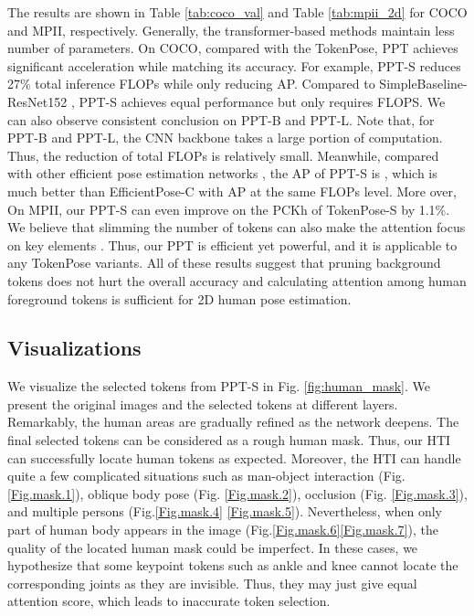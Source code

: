 \documentclass[runningheads]{llncs}
\begin{document}
The results are shown in Table \ref{tab:coco_val} and Table \ref{tab:mpii_2d} for COCO and MPII, respectively. 
Generally, the transformer-based methods \cite{li2021tokenpose,yang2020transpose} maintain less number of parameters. 
On COCO, compared with the TokenPose, PPT achieves significant acceleration while matching its accuracy. 
For example, PPT-S reduces 27\% total inference FLOPs while only reducing  AP. Compared to SimpleBaseline-ResNet152 \cite{xiao2018simple}, PPT-S achieves equal performance but only requires  FLOPS. 
We can also observe consistent conclusion on PPT-B and PPT-L. 
Note that, for PPT-B and PPT-L, the CNN backbone takes a large portion of computation. Thus, the reduction of total FLOPs is relatively small. 
Meanwhile, compared with other efficient pose estimation networks \cite{yu2021lite,zhang2021efficientpose}, the AP of PPT-S is , which is much better than EfficientPose-C \cite{zhang2021efficientpose}  with  AP at the same FLOPs level. 
More over, On MPII, our PPT-S can even improve on the PCKh of TokenPose-S by 1.1\%. 
We believe that slimming the number of tokens can also make the attention focus on key elements \cite{zhu2020deformable}. 
Thus, our PPT is efficient yet powerful, and it is applicable to any TokenPose variants. 
All of these results suggest that pruning background tokens does not hurt the overall accuracy and calculating attention among human foreground tokens is sufficient for 2D human pose estimation. 








\vspace{-0.5em}
\subsection{Visualizations}
\vspace{-0.5em}

We visualize the selected tokens from PPT-S in Fig. \ref{fig:human_mask}. We present the original images and the selected tokens at different layers.  
Remarkably, the human areas are gradually refined as the network deepens. The final selected tokens can be considered as a rough human mask. Thus, our HTI can successfully locate human tokens as expected. 
Moreover, the HTI can handle quite a few complicated situations such as man-object interaction (Fig.\ref{Fig.mask.1}), oblique body pose (Fig. \ref{Fig.mask.2}), occlusion (Fig. \ref{Fig.mask.3}), and multiple persons (Fig.\ref{Fig.mask.4} \ref{Fig.mask.5}). 
Nevertheless, when only part of human body appears in the image (Fig.\ref{Fig.mask.6}\ref{Fig.mask.7}), the quality of the located human mask could be imperfect. 
In these cases, we hypothesize that some keypoint tokens such as ankle and knee cannot locate the corresponding joints as they are invisible. Thus, they may just give equal attention score, which leads to inaccurate token selection. 
\end{document}
